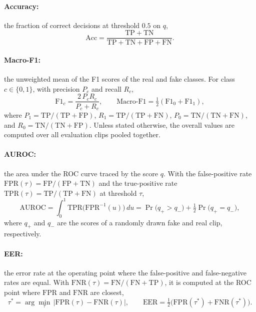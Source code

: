 \paragraph{Accuracy:} the fraction of correct decisions at threshold $0.5$ on $q$,
\begin{equation}
\mathrm{Acc} = \frac{\mathrm{TP} + \mathrm{TN}}{\mathrm{TP} + \mathrm{TN} + \mathrm{FP} + \mathrm{FN}}.
\label{eq:acc}
\end{equation}

\paragraph{Macro-F1:} the unweighted mean of the F1 scores of the real and fake classes. For class $c \in \{0,1\}$, with precision $P_c$ and recall $R_c$,
\begin{equation}
\mathrm{F1}_c = \frac{2\,P_c R_c}{P_c + R_c}, \qquad
\mathrm{Macro\text{-}F1} = \tfrac{1}{2}\left(\mathrm{F1}_0 + \mathrm{F1}_1\right),
\label{eq:macrof1}
\end{equation}
where $P_1 = \mathrm{TP}/(\mathrm{TP}+\mathrm{FP})$, $R_1 = \mathrm{TP}/(\mathrm{TP}+\mathrm{FN})$, $P_0 = \mathrm{TN}/(\mathrm{TN}+\mathrm{FN})$, and $R_0 = \mathrm{TN}/(\mathrm{TN}+\mathrm{FP})$. Unless stated otherwise, the overall values are computed over all evaluation clips pooled together.

\paragraph{AUROC:} the area under the ROC curve traced by the score $q$. With the false-positive rate $\mathrm{FPR}(\tau) = \mathrm{FP}/(\mathrm{FP}+\mathrm{TN})$ and the true-positive rate $\mathrm{TPR}(\tau) = \mathrm{TP}/(\mathrm{TP}+\mathrm{FN})$ at threshold $\tau$,
\begin{equation}
\mathrm{AUROC} = \int_{0}^{1} \mathrm{TPR}\big(\mathrm{FPR}^{-1}(u)\big)\,du
= \Pr\big(q_{+} > q_{-}\big) + \tfrac{1}{2}\Pr\big(q_{+} = q_{-}\big),
\label{eq:auroc}
\end{equation}
where $q_{+}$ and $q_{-}$ are the scores of a randomly drawn fake and real clip, respectively.

\paragraph{EER:} the error rate at the operating point where the false-positive and false-negative rates are equal. With $\mathrm{FNR}(\tau) = \mathrm{FN}/(\mathrm{FN}+\mathrm{TP})$, it is computed at the ROC point where $\mathrm{FPR}$ and $\mathrm{FNR}$ are closest,
\begin{equation}
\tau^{\ast} = \arg\min_{\tau}\,\big|\mathrm{FPR}(\tau) - \mathrm{FNR}(\tau)\big|, \qquad
\mathrm{EER} = \tfrac{1}{2}\big(\mathrm{FPR}(\tau^{\ast}) + \mathrm{FNR}(\tau^{\ast})\big).
\label{eq:eer}
\end{equation}

